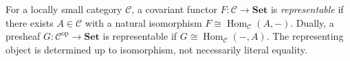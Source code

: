 
For a locally small category $\mathcal C$, a covariant functor $F:\mathcal C\to\mathbf{Set}$ is \emph{representable} if there exists $A\in\mathcal C$ with a natural isomorphism $F\cong\operatorname{Hom}_{\mathcal C}(A,-)$. Dually, a presheaf $G:\mathcal C^{\mathrm{op}}\to\mathbf{Set}$ is representable if $G\cong\operatorname{Hom}_{\mathcal C}(-,A)$. The representing object is determined up to isomorphism, not necessarily literal equality.
